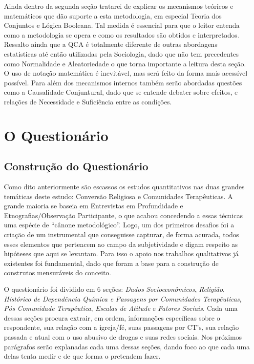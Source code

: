 \documentclass[
	12pt,				%
	oneside,			%
	a4paper,			%
	sumario=tradicional,
	english,			%
	brazil				%
	]{abntex2}
\begin{document}
Ainda dentro da segunda seção tratarei de explicar os mecanismos teóricos e matemáticos que dão suporte a esta metodologia, em especial Teoria dos Conjuntos e Lógica Booleana. Tal medida é essencial para que o leitor entenda como a metodologia se opera e como os resultados são obtidos e interpretados. Ressalto ainda que a QCA é totalmente diferente de outras abordagens estatísticas até então utilizadas pela Sociologia, dado que não tem precedentes como Normalidade e Aleatoriedade \autocite[04]{schneider_set-theoretic_2012} o que torna importante a leitura desta seção. O uso de notação matemática é inevitável, mas será feito da forma mais acessível possível. Para além dos mecanismos internos também serão abordadas questões como a Causalidade Conjuntural, dado que se entende debater sobre efeitos, e relações de Necessidade e Suficiência entre as condições.

\hypertarget{o-questionuxe1rio}{%
\section{O Questionário}\label{o-questionuxe1rio}}

\hypertarget{construuxe7uxe3o-do-questionuxe1rio}{%
\subsection{Construção do Questionário}\label{construuxe7uxe3o-do-questionuxe1rio}}

Como dito anteriormente são escassos os estudos quantitativos nas duas grandes temáticas deste estudo: Conversão Religiosa e Comunidades Terapêuticas. A grande maioria se baseia em Entrevistas em Profundidade e Etnografias/Observação Participante, o que acabou concedendo a essas técnicas uma espécie de ``cânone metodológico''. Logo, um dos primeiros desafios foi a criação de um instrumental que conseguisse capturar, de forma acurada, todos esses elementos que pertencem ao campo da subjetividade e digam respeito as hipóteses que aqui se levantam. Para isso o apoio nos trabalhos qualitativos já existentes foi fundamental, dado que foram a base para a construção de construtos mensuráveis do conceito.

O questionário foi dividido em 6 seções: \emph{Dados Socioeconômicos}, \emph{Religião}, \emph{Histórico de Dependência Química e Passagens por Comunidades Terapêuticas}, \emph{Pós Comunidade Terapêutica}, \emph{Escalas de Atitude} e \emph{Fatores Sociais}. Cada uma dessas seções procura extrair, em ordem, informações específicas sobre o respondente, sua relação com a igreja/fé, suas passagens por CT's, sua relação passada e atual com o uso abusivo de drogas e suas redes sociais. Nos próximos parágrafos serão explanadas cada uma dessas seções, dando foco ao que cada uma delas tenta medir e de que forma o pretendem fazer.
\end{document}
